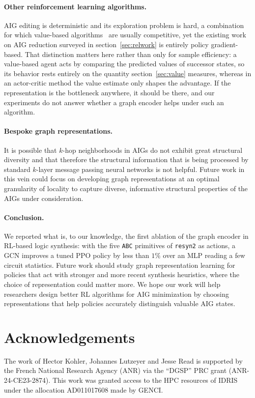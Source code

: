 \documentclass{article}
\begin{document}
\paragraph{Other reinforcement learning algorithms.}
AIG editing is deterministic and its exploration problem is hard, a combination for which value-based algorithms~\cite{watkins1992q,dqn} are usually competitive, yet the existing work on AIG reduction surveyed in section~\ref{sec:relwork} is entirely policy gradient-based.
That distinction matters here rather than only for sample efficiency: a value-based agent acts by comparing the predicted values of successor states, so its behavior rests entirely on the quantity section~\ref{sec:value} measures, whereas in an actor-critic method the value estimate only shapes the advantage.
If the representation is the bottleneck anywhere, it should be there, and our experiments do not answer whether a graph encoder helps under such an algorithm.

\paragraph{Bespoke graph representations.} It is possible that $k$-hop neighborhoods in AIGs do not exhibit great structural diversity and that therefore the structural information that is being processed by standard $k$-layer message passing neural networks is not helpful. Future work in this vein could focus on developing graph representations at an optimal granularity of locality to capture diverse, informative structural properties of the AIGs under consideration.

\paragraph{Conclusion.} We reported what is, to our knowledge, the first ablation of the graph encoder in RL-based logic synthesis: with the five \texttt{ABC} primitives of \texttt{resyn2} as actions, a GCN improves a tuned PPO policy by less than $1\%$ over an MLP reading a few circuit statistics.
Future work should study graph representation learning for policies that act with stronger and more recent synthesis heuristics, where the choice of representation could matter more.
We hope our work will help researchers design better RL algorithms for AIG minimization by choosing representations that help policies accurately distinguish valuable AIG states.

\section*{Acknowledgements}
The work of Hector Kohler, Johannes Lutzeyer and Jesse Read is supported by the French National Research Agency (ANR) via the “DGSP” PRC grant (ANR-24-CE23-2874).
This work was granted access to the HPC resources of IDRIS under the allocation AD011017608 made by GENCI. 


\end{document}
